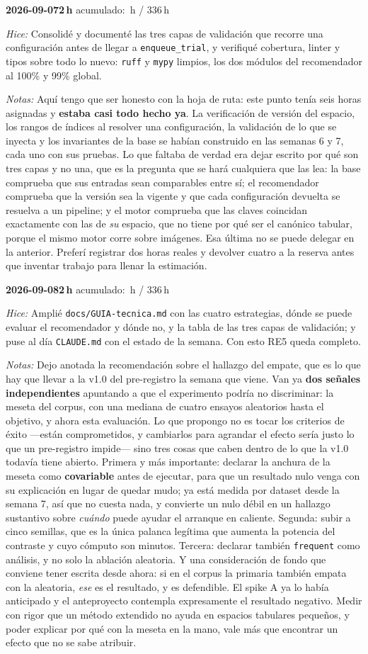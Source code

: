 \documentclass[11pt,letterpaper]{article}
\newcommand{\presupuesto}{336}
\newcommand{\horasacum}{0}
\newcommand{\entrada}[4]{%
  \xdef\horasacum{\fpeval{\horasacum + #2}}%
  \par\medskip
  \noindent\textbf{\color{tecnavy}#1}\quad\textbf{#2\,h}%
  \hfill{\small\color{gris}acumulado: \horasacum\,h / \presupuesto\,h}\par
  \nopagebreak
  \noindent\textit{Hice:} #3\par
  \nopagebreak
  \noindent\textit{Notas:} #4\par
}
\begin{document}
\entrada{2026-09-07}{2}
{Consolidé y documenté las tres capas de validación que recorre una configuración antes de
 llegar a \texttt{enqueue\_trial}, y verifiqué cobertura, linter y tipos sobre todo lo
 nuevo: \texttt{ruff} y \texttt{mypy} limpios, los dos módulos del recomendador al 100\% y
 99\% global.}
{Aquí tengo que ser honesto con la hoja de ruta: este punto tenía seis horas asignadas y
 \textbf{estaba casi todo hecho ya}. La verificación de versión del espacio, los rangos de
 índices al resolver una configuración, la validación de lo que se inyecta y los
 invariantes de la base se habían construido en las semanas 6 y 7, cada uno con sus
 pruebas. Lo que faltaba de verdad era dejar escrito por qué son tres capas y no una, que
 es la pregunta que se hará cualquiera que las lea: la base comprueba que sus entradas sean
 comparables entre sí; el recomendador comprueba que la versión sea la vigente y que cada
 configuración devuelta se resuelva a un pipeline; y el motor comprueba que las claves
 coincidan exactamente con las de \emph{su} espacio, que no tiene por qué ser el canónico
 tabular, porque el mismo motor corre sobre imágenes. Esa última no se puede delegar en la
 anterior. Preferí registrar dos horas reales y devolver cuatro a la reserva antes que
 inventar trabajo para llenar la estimación.}

\entrada{2026-09-08}{2}
{Amplié \texttt{docs/GUIA-tecnica.md} con las cuatro estrategias, dónde se puede evaluar el
 recomendador y dónde no, y la tabla de las tres capas de validación; y puse al día
 \texttt{CLAUDE.md} con el estado de la semana. Con esto RE5 queda completo.}
{Dejo anotada la recomendación sobre el hallazgo del empate, que es lo que hay que llevar a
 la v1.0 del pre-registro la semana que viene. Van ya \textbf{dos señales independientes}
 apuntando a que el experimento podría no discriminar: la meseta del corpus, con una
 mediana de cuatro ensayos aleatorios hasta el objetivo, y ahora esta evaluación. Lo que
 propongo no es tocar los criterios de éxito —están comprometidos, y cambiarlos para
 agrandar el efecto sería justo lo que un pre-registro impide— sino tres cosas que caben
 dentro de lo que la v1.0 todavía tiene abierto. Primera y más importante: declarar la
 anchura de la meseta como \textbf{covariable} antes de ejecutar, para que un resultado
 nulo venga con su explicación en lugar de quedar mudo; ya está medida por dataset desde la
 semana 7, así que no cuesta nada, y convierte un nulo débil en un hallazgo sustantivo
 sobre \emph{cuándo} puede ayudar el arranque en caliente. Segunda: subir a cinco semillas,
 que es la única palanca legítima que aumenta la potencia del contraste y cuyo cómputo son
 minutos. Tercera: declarar también \texttt{frequent} como análisis, y no solo la ablación
 aleatoria. Y una consideración de fondo que conviene tener escrita desde ahora: si en el
 corpus la primaria también empata con la aleatoria, \emph{ese} es el resultado, y es
 defendible. El spike A ya lo había anticipado y el anteproyecto contempla expresamente el
 resultado negativo. Medir con rigor que un método extendido no ayuda en espacios tabulares
 pequeños, y poder explicar por qué con la meseta en la mano, vale más que encontrar un
 efecto que no se sabe atribuir.}
\end{document}
